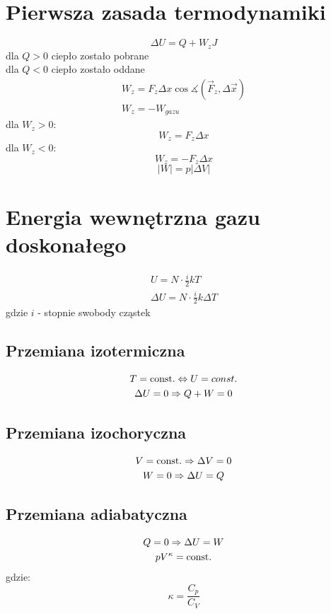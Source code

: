   \section{Pierwsza zasada termodynamiki}
    \begin{equation}
      \Delta U = Q + W_z \unit{J}
    \end{equation}
    dla $Q > 0$ ciepło zostało pobrane\\
    dla $Q < 0$ ciepło zostało oddane
    \begin{gather}
      W_z = F_z\Delta x\cos\measuredangle(\vec F_z, \Delta\vec x)\\
      W_z = -W_{gazu}
    \end{gather}
    dla $W_z > 0$:
    \begin{equation}
      W_z = F_z\Delta x
    \end{equation}
    dla $W_z < 0$:
    \begin{equation}
      W_z = -F_z\Delta x
    \end{equation}
    \begin{equation}
      |W| = p|\Delta V|
    \end{equation}
  \section{Energia wewnętrzna gazu doskonałego}
    \begin{gather}
      U = N\cdot\frac{i}{2}kT\\
      \Delta U = N\cdot\frac{i}{2}k\Delta T
    \end{gather}
    gdzie $i$ - stopnie swobody cząstek
    \subsection{Przemiana izotermiczna}
      \begin{gather}
        T = \operatorname{const.} \Leftrightarrow U = const.\\
        \Delta U = 0 \Rightarrow Q + W = 0
      \end{gather}
    \subsection{Przemiana izochoryczna}
      \begin{gather}
        V = \operatorname{const.} \Rightarrow \Delta V = 0\\
        W = 0 \Rightarrow \Delta U = Q
      \end{gather}
    \subsection{Przemiana adiabatyczna}
      \begin{gather}
        Q = 0 \Rightarrow \Delta U = W\\
        pV^\kappa = \operatorname{const.}
      \end{gather}
      gdzie:
      \begin{equation}
        \kappa = \frac{C_p}{C_V}
      \end{equation}
